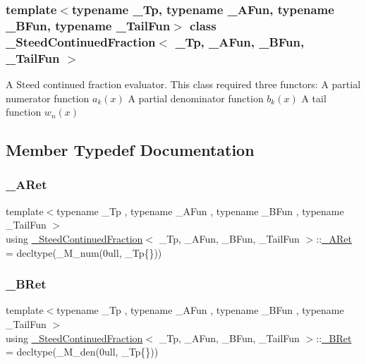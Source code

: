 \subsubsection*{template$<$typename \+\_\+\+Tp, typename \+\_\+\+A\+Fun, typename \+\_\+\+B\+Fun, typename \+\_\+\+Tail\+Fun$>$\newline
class \+\_\+\+Steed\+Continued\+Fraction$<$ \+\_\+\+Tp, \+\_\+\+A\+Fun, \+\_\+\+B\+Fun, \+\_\+\+Tail\+Fun $>$}

A Steed continued fraction evaluator. This class required three functors\+: A partial numerator function $ a_k(x) $ A partial denominator function $ b_k(x) $ A tail function $ w_n(x) $ 

\subsection{Member Typedef Documentation}
\mbox{\label{class__SteedContinuedFraction_a52fc9abde4ea881c7b1cea53bd0e72ee}} 
\subsubsection{\texorpdfstring{\+\_\+\+A\+Ret}{\_ARet}}
{\footnotesize\ttfamily template$<$typename \+\_\+\+Tp , typename \+\_\+\+A\+Fun , typename \+\_\+\+B\+Fun , typename \+\_\+\+Tail\+Fun $>$ \\
using \hyperlink{class__SteedContinuedFraction}{\+\_\+\+Steed\+Continued\+Fraction}$<$ \+\_\+\+Tp, \+\_\+\+A\+Fun, \+\_\+\+B\+Fun, \+\_\+\+Tail\+Fun $>$\+::\hyperlink{class__SteedContinuedFraction_a52fc9abde4ea881c7b1cea53bd0e72ee}{\+\_\+\+A\+Ret} =  decltype(\+\_\+\+M\+\_\+num(0ull, \+\_\+\+Tp\{\}))}

\mbox{\label{class__SteedContinuedFraction_ab5af06efbdaf40ddcdfdd36a0872854e}} 
\subsubsection{\texorpdfstring{\+\_\+\+B\+Ret}{\_BRet}}
{\footnotesize\ttfamily template$<$typename \+\_\+\+Tp , typename \+\_\+\+A\+Fun , typename \+\_\+\+B\+Fun , typename \+\_\+\+Tail\+Fun $>$ \\
using \hyperlink{class__SteedContinuedFraction}{\+\_\+\+Steed\+Continued\+Fraction}$<$ \+\_\+\+Tp, \+\_\+\+A\+Fun, \+\_\+\+B\+Fun, \+\_\+\+Tail\+Fun $>$\+::\hyperlink{class__SteedContinuedFraction_ab5af06efbdaf40ddcdfdd36a0872854e}{\+\_\+\+B\+Ret} =  decltype(\+\_\+\+M\+\_\+den(0ull, \+\_\+\+Tp\{\}))}

